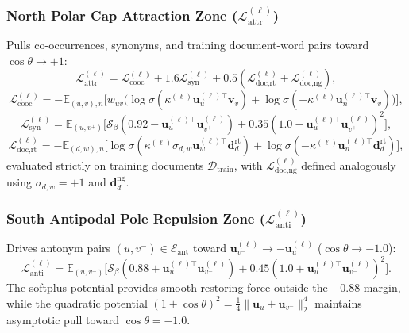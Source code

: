 \documentclass[journal]{IEEEtran}
\begin{document}
\subsubsection{North Polar Cap Attraction Zone ($\mathcal{L}_{\text{attr}}^{(\ell)}$)}
Pulls co-occurrences, synonyms, and training document-word pairs toward $\cos\theta \to +1$:
\begin{equation}
\mathcal{L}_{\text{attr}}^{(\ell)} = \mathcal{L}_{\text{cooc}}^{(\ell)} + 1.6\mathcal{L}_{\text{syn}}^{(\ell)} + 0.5\left(\mathcal{L}_{\text{doc,rt}}^{(\ell)} + \mathcal{L}_{\text{doc,ng}}^{(\ell)}\right),
\label{eq:loss_attr}
\end{equation}
\begin{equation}
\mathcal{L}_{\text{cooc}}^{(\ell)} = -\mathbb{E}_{(u,v), n}\Big[ w_{uv}\Big(\log\sigma(\kappa^{(\ell)}\mathbf{u}_u^{(\ell)\top}\mathbf{v}_v) + \log\sigma(-\kappa^{(\ell)}\mathbf{u}_n^{(\ell)\top}\mathbf{v}_v)\Big) \Big],
\label{eq:loss_cooc}
\end{equation}
\begin{equation}
\mathcal{L}_{\text{syn}}^{(\ell)} = \mathbb{E}_{(u,v^+)}\Big[ \mathcal{S}_\beta(0.92 - \mathbf{u}_u^{(\ell)\top}\mathbf{u}_{v^+}^{(\ell)}) + 0.35(1.0 - \mathbf{u}_u^{(\ell)\top}\mathbf{u}_{v^+}^{(\ell)})^2 \Big],
\label{eq:loss_syn}
\end{equation}
\begin{equation}
\mathcal{L}_{\text{doc,rt}}^{(\ell)} = -\mathbb{E}_{(d,w), n}\Big[ \log\sigma(\kappa^{(\ell)}\sigma_{d,w}\mathbf{u}_w^{(\ell)\top}\mathbf{d}_d^{\text{rt}}) + \log\sigma(-\kappa^{(\ell)}\mathbf{u}_n^{(\ell)\top}\mathbf{d}_d^{\text{rt}}) \Big],
\label{eq:loss_doc}
\end{equation}
evaluated strictly on training documents $\mathcal{D}_{\text{train}}$, with $\mathcal{L}_{\text{doc,ng}}^{(\ell)}$ defined analogously using $\sigma_{d,w} = +1$ and $\mathbf{d}_d^{\text{ng}}$.

\subsubsection{South Antipodal Pole Repulsion Zone ($\mathcal{L}_{\text{anti}}^{(\ell)}$)}
Drives antonym pairs $(u, v^-) \in \mathcal{E}_{\text{ant}}$ toward $\mathbf{u}_{v^-}^{(\ell)} \to -\mathbf{u}_u^{(\ell)}$ ($\cos\theta \to -1.0$):
\begin{equation}
\mathcal{L}_{\text{anti}}^{(\ell)} = \mathbb{E}_{(u,v^-)}\Big[ \mathcal{S}_\beta(0.88 + \mathbf{u}_u^{(\ell)\top}\mathbf{u}_{v^-}^{(\ell)}) + 0.45(1.0 + \mathbf{u}_u^{(\ell)\top}\mathbf{u}_{v^-}^{(\ell)})^2 \Big].
\label{eq:loss_anti}
\end{equation}
The softplus potential provides smooth restoring force outside the $-0.88$ margin, while the quadratic potential $(1 + \cos\theta)^2 = \frac{1}{4}\|\mathbf{u}_u + \mathbf{u}_{v^-}\|_2^4$ maintains asymptotic pull toward $\cos\theta = -1.0$.
\end{document}
